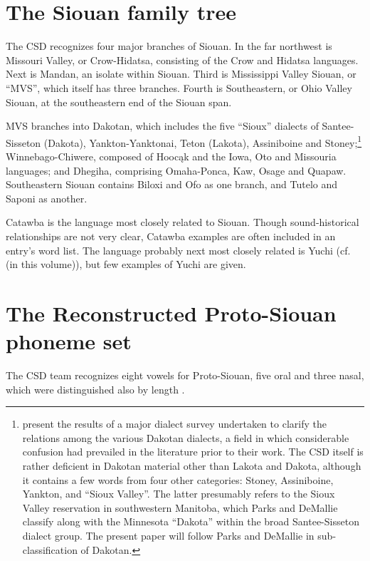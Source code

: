 \documentclass[output=paper]{LSP/langsci}
\begin{document}
\section{The Siouan family tree}

The CSD recognizes four major branches of Siouan. In the far northwest is Missouri Valley, or Crow-Hidatsa, consisting of the Crow and Hidatsa languages. Next is Mandan, an isolate within Siouan. Third is Mississippi Valley Siouan, or ``MVS'', which itself has three branches. Fourth is Southeastern, or Ohio Valley Siouan, at the southeastern end of the Siouan span.

MVS branches into Dakotan, which includes the five ``Sioux'' dialects of Santee-Sisseton (Dakota), Yankton-Yanktonai, Teton (Lakota), Assiniboine and Stoney;\footnote{\citet{ParksDeMallie1992} present the results of a major dialect survey undertaken to clarify the relations among the various Dakotan dialects, a field in which considerable confusion had prevailed in the literature prior to their work.  The CSD itself is rather deficient in Dakotan material other than Lakota and Dakota, although it contains a few words from four other categories: Stoney, Assiniboine, Yankton, and ``Sioux Valley''.  The latter presumably refers to the Sioux Valley reservation in southwestern Manitoba, which Parks and DeMallie classify along with the Minnesota ``Dakota'' within the broad Santee-Sisseton dialect group.  The present paper will follow Parks and DeMallie in sub-classification of Dakotan.}  Winnebago-Chiwere, composed of Hooc\k{a}k and the Iowa, Oto and Missouria languages; and Dhegiha, comprising Omaha-Ponca, Kaw, Osage and Quapaw.  Southeastern Siouan contains Biloxi and Ofo as one branch, and Tutelo and Saponi as another.

Catawba is the language most closely related to Siouan.  Though sound-historical relationships are not very clear, Catawba examples are often included in an entry's word list.  The language probably next most closely related is Yuchi (cf. \citealt{Kasak2016} (in this volume)), but few examples of Yuchi are given.


\section{The Reconstructed Proto-Siouan phoneme set}

The CSD team recognizes eight vowels for Proto-Siouan, five oral and three nasal, which were distinguished also by length \citep{RankinEtAl1998}.%
 
\end{document}
